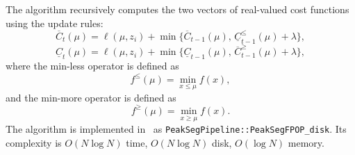 \documentclass[article]{jss}
\newcommand{\R}{\proglang{R}}
\begin{document}
The algorithm recursively computes the two vectors of real-valued cost
functions using the update rules:
\begin{equation}
  \label{eq:dp-over}
  \overline C_{t}(\mu) = \ell(\mu, z_i) + \min\{
  \overline C_{t-1}(\mu),\, 
  \underline C_{t-1}^\leq(\mu)+\lambda
\},
\end{equation}
\begin{equation}
  \label{eq:dp-under}
    \underline C_{t}(\mu) = \ell(\mu, z_i) + \min\{
  \underline C_{t-1}(\mu),\, 
  \overline C_{t-1}^\geq(\mu)+\lambda
\},
\end{equation}
where the min-less operator is defined as 
\begin{equation}
  \label{eq:min-less}
  f^\leq(\mu) = \min_{x\leq\mu} f(x),
\end{equation}
and the min-more operator is defined as
\begin{equation}
  \label{eq:min-more}
  f^\geq(\mu) = \min_{x\geq\mu} f(x).
\end{equation}
The algorithm is implemented in \R\ as
\verb|PeakSegPipeline::PeakSegFPOP_disk|. Its complexity is
$O(N\log N)$ time, $O(N\log N)$ disk, $O(\log N)$ memory.
\end{document}
